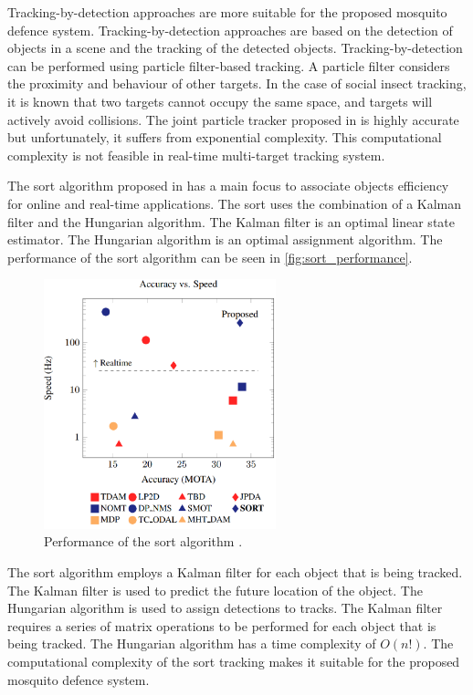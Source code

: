 Tracking-by-detection approaches are more suitable for the proposed mosquito defence system. Tracking-by-detection approaches are based on the detection of objects in a scene and the tracking of the detected objects. Tracking-by-detection can be performed using particle filter-based tracking. A particle filter considers the proximity and behaviour of other targets. In the case of social insect tracking, it is known that two targets cannot occupy the same space, and targets will actively avoid collisions. The joint particle tracker proposed in \cite{Khan2003} is highly accurate but unfortunately, it suffers from exponential complexity. This computational complexity is not feasible in real-time multi-target tracking system.

The \gls{sort} algorithm proposed in \cite{SORT-Bewley2017} has a main focus to associate objects efficiency for online and real-time applications. The \gls{sort} uses the combination of a Kalman filter and the Hungarian algorithm. The Kalman filter is an optimal linear state estimator. The Hungarian algorithm is an optimal assignment algorithm. The performance of the \gls{sort} algorithm can be seen in \autoref{fig:sort_performance}.
\begin{figure}[h]
  \centering
  \includegraphics[width=0.6\textwidth]{figures/sort_performance.png}
  \caption{Performance of the \gls{sort} algorithm \cite{SORT-Bewley2017}.}
  \label{fig:sort_performance}
\end{figure}
The \gls{sort} algorithm employs a Kalman filter for each object that is being tracked. The Kalman filter is used to predict the future location of the object. The Hungarian algorithm is used to assign detections to tracks. The Kalman filter requires a series of matrix operations to be performed for each object that is being tracked. The Hungarian algorithm has a time complexity of $O\left(n!\right)$. The computational complexity of the \gls{sort} tracking makes it suitable for the proposed mosquito defence system.

